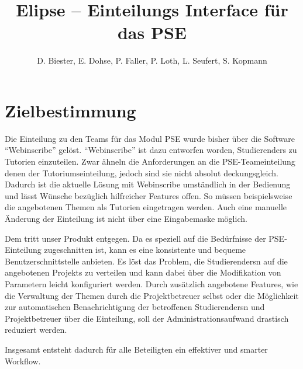 \documentclass[parskip=full]{scrartcl}
\begin{document}
\title{Elipse -- Einteilungs Interface für das PSE}
\author{D. Biester, E. Dohse, P. Faller, P. Loth, L. Seufert, S. Kopmann}
\zweitgutachter{}

\mytitlepage

\tableofcontents
\pagebreak

\section{Zielbestimmung}

Die \gls{Einteilung} zu den \glspl{Team} für das \gls{Modul} \gls{PSE} wurde
bisher über die Software \enquote{Webinscribe} gelöst.
\enquote{Webinscribe} ist dazu entworfen worden, \glspl{Studierender} zu Tutorien einzuteilen.
Zwar ähneln die Anforderungen an die \gls{PSE}-\gls{Team}einteilung denen der Tutoriumseinteilung,
jedoch sind sie nicht absolut deckungsgleich. 
Dadurch ist die aktuelle Lösung mit Webinscribe umständlich in der Bedienung und lässt Wünsche bezüglich hilfreicher Features offen.
So müssen beispielsweise die angebotenen Themen als Tutorien eingetragen werden. 
Auch eine manuelle Änderung der \gls{Einteilung} ist nicht über eine Eingabemaske
möglich.

Dem tritt unser Produkt entgegen.
Da es speziell auf die Bedürfnisse der \gls{PSE}-\gls{Einteilung} zugeschnitten ist, 
kann es eine konsistente und bequeme Benutzerschnittstelle anbieten.
Es löst das Problem, die \glspl{Studierender}n auf die angebotenen \glspl{Projekt} zu verteilen
und kann dabei über die Modifikation von Parametern leicht konfiguriert werden.
Durch zusätzlich angebotene Features, wie die Verwaltung der Themen durch die \gls{Projektbetreuer} selbst 
oder die Möglichkeit zur automatischen Benachrichtigung der betroffenen \glspl{Studierender}n und \gls{Projektbetreuer} über die
\gls{Einteilung}, soll der Administrationsaufwand drastisch reduziert werden. 

Insgesamt entsteht dadurch für alle Beteiligten ein effektiver und smarter Workflow.
\end{document}
